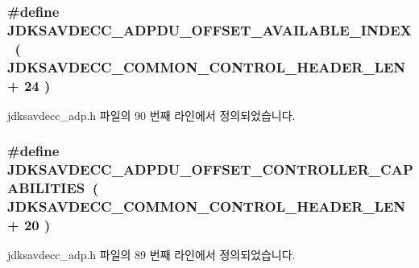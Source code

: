 \subsubsection[{\texorpdfstring{J\+D\+K\+S\+A\+V\+D\+E\+C\+C\+\_\+\+A\+D\+P\+D\+U\+\_\+\+O\+F\+F\+S\+E\+T\+\_\+\+A\+V\+A\+I\+L\+A\+B\+L\+E\+\_\+\+I\+N\+D\+EX}{JDKSAVDECC_ADPDU_OFFSET_AVAILABLE_INDEX}}]{\setlength{\rightskip}{0pt plus 5cm}\#define J\+D\+K\+S\+A\+V\+D\+E\+C\+C\+\_\+\+A\+D\+P\+D\+U\+\_\+\+O\+F\+F\+S\+E\+T\+\_\+\+A\+V\+A\+I\+L\+A\+B\+L\+E\+\_\+\+I\+N\+D\+EX~( {\bf J\+D\+K\+S\+A\+V\+D\+E\+C\+C\+\_\+\+C\+O\+M\+M\+O\+N\+\_\+\+C\+O\+N\+T\+R\+O\+L\+\_\+\+H\+E\+A\+D\+E\+R\+\_\+\+L\+EN} + 24 )}\hypertarget{group__adpdu_gadeda106636710de28b55a76369c46bd9}{}\label{group__adpdu_gadeda106636710de28b55a76369c46bd9}


jdksavdecc\+\_\+adp.\+h 파일의 90 번째 라인에서 정의되었습니다.

\subsubsection[{\texorpdfstring{J\+D\+K\+S\+A\+V\+D\+E\+C\+C\+\_\+\+A\+D\+P\+D\+U\+\_\+\+O\+F\+F\+S\+E\+T\+\_\+\+C\+O\+N\+T\+R\+O\+L\+L\+E\+R\+\_\+\+C\+A\+P\+A\+B\+I\+L\+I\+T\+I\+ES}{JDKSAVDECC_ADPDU_OFFSET_CONTROLLER_CAPABILITIES}}]{\setlength{\rightskip}{0pt plus 5cm}\#define J\+D\+K\+S\+A\+V\+D\+E\+C\+C\+\_\+\+A\+D\+P\+D\+U\+\_\+\+O\+F\+F\+S\+E\+T\+\_\+\+C\+O\+N\+T\+R\+O\+L\+L\+E\+R\+\_\+\+C\+A\+P\+A\+B\+I\+L\+I\+T\+I\+ES~( {\bf J\+D\+K\+S\+A\+V\+D\+E\+C\+C\+\_\+\+C\+O\+M\+M\+O\+N\+\_\+\+C\+O\+N\+T\+R\+O\+L\+\_\+\+H\+E\+A\+D\+E\+R\+\_\+\+L\+EN} + 20 )}\hypertarget{group__adpdu_ga3e47949e00143c3125bc88b85737656f}{}\label{group__adpdu_ga3e47949e00143c3125bc88b85737656f}


jdksavdecc\+\_\+adp.\+h 파일의 89 번째 라인에서 정의되었습니다.

